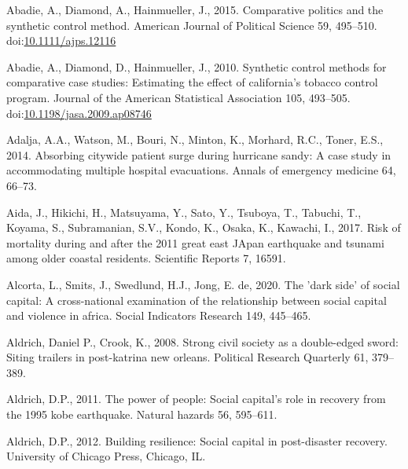 \documentclass[]{elsarticle} %
\newlength{\cslhangindent}
\newlength{\cslentryspacingunit} %
\newenvironment{CSLReferences}[2] %
 {%
  \setlength{\parindent}{0pt}
  \ifodd #1
  \let\oldpar\par
  \def\par{\hangindent=\cslhangindent\oldpar}
  \fi
  \setlength{\parskip}{#2\cslentryspacingunit}
 }%
 {}
\begin{document}
\hypertarget{refs}{}
\begin{CSLReferences}{1}{0}
\leavevmode{}%
Abadie, A., Diamond, A., Hainmueller, J., 2015. Comparative politics and
the synthetic control method. American Journal of Political Science 59,
495--510.
doi:\href{https://doi.org/10.1111/ajps.12116}{10.1111/ajps.12116}

\leavevmode{}%
Abadie, A., Diamond, D., Hainmueller, J., 2010. Synthetic control
methods for comparative case studies: Estimating the effect of
california's tobacco control program. Journal of the American
Statistical Association 105, 493--505.
doi:\href{https://doi.org/10.1198/jasa.2009.ap08746}{10.1198/jasa.2009.ap08746}

\leavevmode{}%
Adalja, A.A., Watson, M., Bouri, N., Minton, K., Morhard, R.C., Toner,
E.S., 2014. Absorbing citywide patient surge during hurricane sandy: A
case study in accommodating multiple hospital evacuations. Annals of
emergency medicine 64, 66--73.

\leavevmode{}%
Aida, J., Hikichi, H., Matsuyama, Y., Sato, Y., Tsuboya, T., Tabuchi,
T., Koyama, S., Subramanian, S.V., Kondo, K., Osaka, K., Kawachi, I.,
2017. Risk of mortality during and after the 2011 great east JApan
earthquake and tsunami among older coastal residents. Scientific Reports
7, 16591.

\leavevmode{}%
Alcorta, L., Smits, J., Swedlund, H.J., Jong, E. de, 2020. The 'dark
side' of social capital: A cross-national examination of the
relationship between social capital and violence in africa. Social
Indicators Research 149, 445--465.

\leavevmode{}%
Aldrich, Daniel P., Crook, K., 2008. Strong civil society as a
double-edged sword: Siting trailers in post-katrina new orleans.
Political Research Quarterly 61, 379--389.

\leavevmode{}%
Aldrich, D.P., 2011. The power of people: Social capital's role in
recovery from the 1995 kobe earthquake. Natural hazards 56, 595--611.

\leavevmode{}%
Aldrich, D.P., 2012. Building resilience: Social capital in
post-disaster recovery. University of Chicago Press, Chicago, IL.


\end{CSLReferences}
\end{document}
